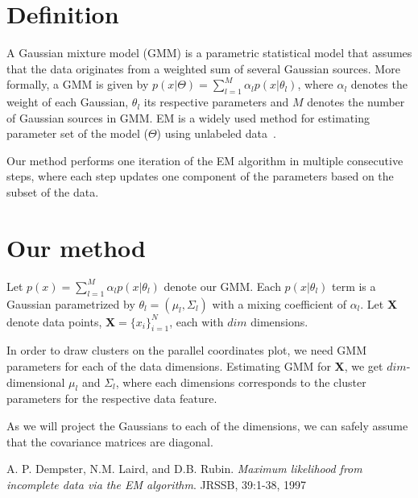 \documentclass[10pt,a4paper]{article}
\begin{document}
\section{Definition}
A Gaussian mixture model (GMM) is a parametric statistical model that assumes that the data originates from a weighted sum of several Gaussian sources. More formally, a GMM is given by
$p(x|\Theta) = \sum^M_{l=1}\alpha_lp(x|\theta_l)$, where $\alpha_l$ denotes the weight of each Gaussian, $\theta_l$ its respective parameters and  $M$ denotes the number of Gaussian sources in GMM. EM is a widely used method for estimating parameter set of the model ($\Theta$) using unlabeled data~\cite{dempster77}.

Our method performs one iteration of the EM algorithm in multiple consecutive steps, where each step updates one component of the parameters based on the subset of the data.

\section{Our method}
Let
$p(x) = \sum_{l=1}^M\alpha_lp(x|\theta_l)$ denote our GMM. Each 
$p(x|\theta_l)$ term is a Gaussian parametrized by $\theta_l = (\mu_l, \Sigma_l)$ with a mixing coefficient of $\alpha_l$. Let {\bf X} denote data points, {\bf X}$ = \{x_i\}_{i=1}^N$, each with $dim$ dimensions.

In order to draw clusters on the parallel coordinates plot, we need GMM parameters for each of the data dimensions. Estimating GMM for {\bf X}, we get $dim$-dimensional $\mu_l$ and $\Sigma_l$, where each dimensions corresponds to the cluster parameters for the respective data feature. 





As we will project the Gaussians to each of the dimensions, we can safely assume that the covariance matrices are diagonal.







\begin{thebibliography}{9}

  A. P. Dempster, N.M. Laird, and D.B. Rubin.
  \emph{Maximum likelihood from incomplete data via the EM algorithm}.
  JRSSB, 39:1-38,
  1997
\end{thebibliography}
\end{document}
